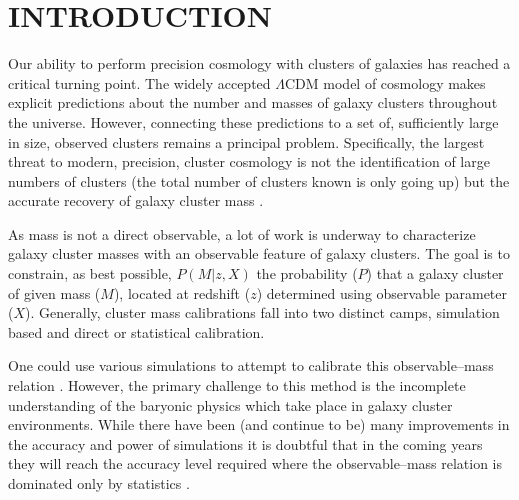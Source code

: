 \documentclass[fleqn,usenatbib]{mnras}
\begin{document}
\section{INTRODUCTION}
Our ability to perform precision cosmology with clusters of galaxies has reached a critical turning point. The widely accepted $\Lambda$CDM model of cosmology makes explicit predictions about the number and masses of galaxy clusters throughout the universe. However, connecting these predictions to a set of, sufficiently large in size, observed clusters remains a principal problem. Specifically, the largest threat to modern, precision, cluster cosmology is not the identification of large numbers of clusters (the total number of clusters known is only going up) but the accurate recovery of galaxy cluster mass .

As mass is not a direct observable, a lot of work is underway to characterize galaxy cluster masses with an observable feature of galaxy clusters. The goal is to constrain, as best possible, $P(M|z, X)$ the probability ($P$) that a galaxy cluster of given mass ($M$), located at redshift ($z$) determined using observable parameter ($X$). Generally, cluster mass calibrations fall into two distinct camps, simulation based and direct or statistical calibration.

One could use various simulations to attempt to calibrate this observable--mass relation . However, the primary challenge to this method is the incomplete understanding of the baryonic physics which take place in galaxy cluster environments. While there have been (and continue to be) many improvements in the accuracy and power of simulations it is doubtful that in the coming years they will reach the accuracy level required where the observable--mass relation is dominated only by statistics \citep{Weinberg2013}. 
 
\end{document}
